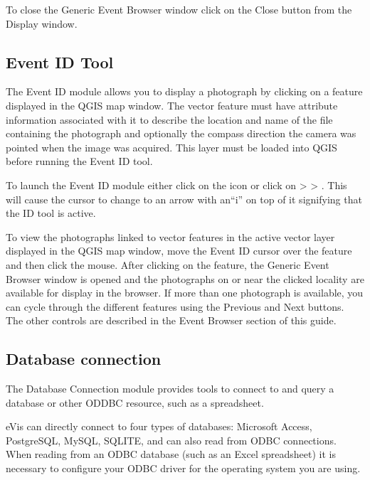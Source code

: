 To close the Generic Event Browser window click on the Close button from the Display window.

\subsection{Event ID Tool}\label{evis_id_tool}

The Event ID module allows you to display a photograph by clicking on a feature displayed in the
QGIS map window. The vector feature must have attribute information associated with it to describe
the location and name of the file containing the photograph and optionally the compass direction the
camera was pointed when the image was acquired. This layer must be loaded into QGIS before running
the Event ID tool.

\label{evis_launch_id}

To launch the Event ID module either click on the 
icon or click on  >  >
. This will cause the cursor to change to an arrow with an``i'' on top of
it signifying that the ID tool is active.

To view the photographs linked to vector features in the active vector layer displayed in the QGIS
map window, move the Event ID cursor over the feature and then click the mouse. After clicking on
the feature, the Generic Event Browser window is opened and the photographs on or near the clicked
locality are available for display in the browser. If more than one photograph is available, you can
cycle through the different features using the Previous and Next buttons. The other controls are
described in the Event Browser section of this guide.

\subsection{Database connection}\label{evis_database}

The Database Connection module provides tools to connect to and query a database or other ODDBC
resource, such as a spreadsheet.

eVis can directly connect to four types of databases: Microsoft Access, PostgreSQL, MySQL, SQLITE,
and can also read from ODBC connections. When reading from an ODBC database (such as an Excel
spreadsheet) it is necessary to configure your ODBC driver for the operating system you are using.

